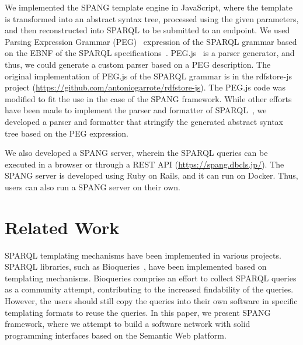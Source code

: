 \documentclass[runningheads]{llncs}
\begin{document}
We implemented the SPANG template engine in JavaScript, where the template is transformed into an abstract syntax tree, processed using the given parameters, and then reconstructed into SPARQL to be submitted to an endpoint. 
We used Parsing Expression Grammar (PEG)~\cite{peg} expression of the SPARQL grammar based on the EBNF of the SPARQL specifications~\cite{sparql}. 
PEG.js~\cite{pegjs} is a parser generator, and thus, we could generate a custom parser based on a PEG description. 
The original implementation of PEG.js of the SPARQL grammar is in the rdfstore-js project (\url{https://github.com/antoniogarrote/rdfstore-js}).
The PEG.js code was modified to fit the use in the case of the SPANG framework.
While other efforts have been made to implement the parser and formatter of SPARQL~\cite{sparql-js}, we developed a parser and formatter that stringify the generated abstract syntax tree based on the PEG expression. %

We also developed a SPANG server, wherein the SPARQL queries can be executed in a browser or through a REST API (\url{https://spang.dbcls.jp/}).
The SPANG server is developed using Ruby on Rails, and it can run on Docker.
Thus, users can also run a SPANG server on their own. 

\section{Related Work}

SPARQL templating mechanisms have been implemented in various projects. SPARQL libraries, such as Bioqueries~\cite{bioqueries}, have been implemented based on templating mechanisms. Bioqueries comprise an effort to collect SPARQL queries as a community attempt, contributing to the increased findability of the queries.
However, the users should still copy the queries into their own software in specific templating formats to reuse the queries.
In this paper, we present SPANG framework, where we attempt to build a software network with solid programming interfaces based on the Semantic Web platform.
\end{document}
